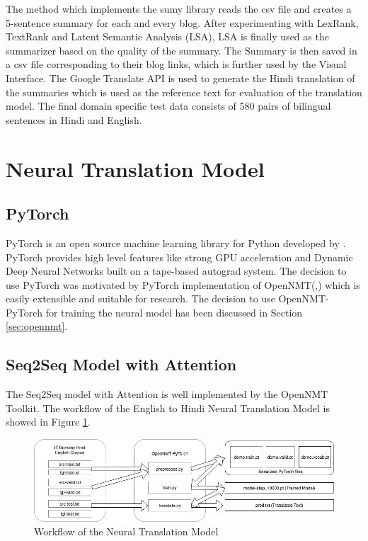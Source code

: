 The method which implements the sumy library reads the csv file and creates a 5-sentence summary for each and every blog. After experimenting with LexRank, TextRank and Latent Semantic Analysis (LSA), LSA is finally used as the summarizer based on the quality of the summary. The Summary is then saved in a csv file corresponding to their blog links, which is further used by the Visual Interface. The Google Translate API is used to generate the Hindi translation of the summaries which is used as the reference text for evaluation of the translation model. The final domain specific test data consists of 580 pairs of bilingual sentences in Hindi and English.

\section{Neural Translation Model}
\subsection{PyTorch}
PyTorch is an open source machine learning library for Python developed by \cite{paszke2017automatic}. PyTorch provides high level features like strong GPU acceleration and Dynamic Deep Neural Networks  built on a tape-based autograd system. The decision to use PyTorch was motivated by PyTorch implementation of OpenNMT(\citeauthor{opennmt},\citeyear{opennmt}) which is easily extensible and suitable for research. The decision to use OpenNMT-PyTorch for training the neural model has been discussed in Section \ref{sec:opennmt}.
\subsection{Seq2Seq Model with Attention}
The Seq2Seq model with Attention is well implemented by the OpenNMT Toolkit. The workflow of the English to Hindi Neural Translation Model is showed in Figure \ref{nmtwork}.

\begin{figure}
\includegraphics[width=\textwidth]{figures/nmtwork.png}
\caption{Workflow of the Neural Translation Model} 
\label{nmtwork}
\end{figure}

